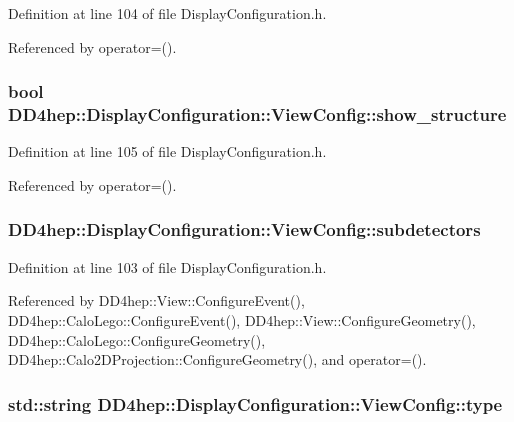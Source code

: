 Definition at line 104 of file DisplayConfiguration.h.

Referenced by operator=().\hypertarget{class_d_d4hep_1_1_display_configuration_1_1_view_config_a354dde730ac96e0795b996a0c344c303}{
\subsubsection[{show\_\-structure}]{\setlength{\rightskip}{0pt plus 5cm}bool {\bf DD4hep::DisplayConfiguration::ViewConfig::show\_\-structure}}}
\label{class_d_d4hep_1_1_display_configuration_1_1_view_config_a354dde730ac96e0795b996a0c344c303}


Definition at line 105 of file DisplayConfiguration.h.

Referenced by operator=().\hypertarget{class_d_d4hep_1_1_display_configuration_1_1_view_config_ab1466448cad80dfdb76cc9f4c1f252b1}{
\subsubsection[{subdetectors}]{ {\bf DD4hep::DisplayConfiguration::ViewConfig::subdetectors}}}
\label{class_d_d4hep_1_1_display_configuration_1_1_view_config_ab1466448cad80dfdb76cc9f4c1f252b1}


Definition at line 103 of file DisplayConfiguration.h.

Referenced by DD4hep::View::ConfigureEvent(), DD4hep::CaloLego::ConfigureEvent(), DD4hep::View::ConfigureGeometry(), DD4hep::CaloLego::ConfigureGeometry(), DD4hep::Calo2DProjection::ConfigureGeometry(), and operator=().\hypertarget{class_d_d4hep_1_1_display_configuration_1_1_view_config_ae02fb914afdda0a021ff81d40c928844}{
\subsubsection[{type}]{\setlength{\rightskip}{0pt plus 5cm}std::string {\bf DD4hep::DisplayConfiguration::ViewConfig::type}}}
\label{class_d_d4hep_1_1_display_configuration_1_1_view_config_ae02fb914afdda0a021ff81d40c928844}


